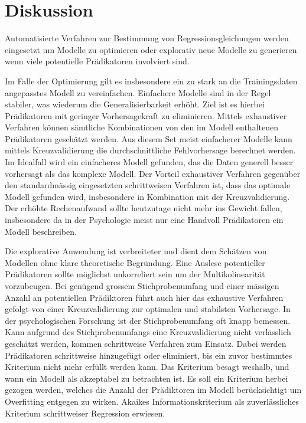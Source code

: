 \section{Diskussion}
Automatisierte Verfahren zur Bestimmung von Regressionsgleichungen werden eingesetzt um Modelle zu optimieren oder explorativ neue Modelle zu generieren wenn viele potentielle Prädikatoren involviert sind. 

Im Falle der Optimierung gilt es insbesondere ein zu stark an die Trainingsdaten angepasstes Modell zu vereinfachen. 
Einfachere Modelle sind in der Regel stabiler, was wiederum die Generalisierbarkeit erhöht.
Ziel ist es hierbei Prädikatoren mit geringer Vorhersagekraft zu eliminieren. Mittels exhaustiver Verfahren können sämtliche Kombinationen von den im Modell enthaltenen Prädikatoren geschätzt werden.
Aus diesem Set meist einfacherer Modelle kann mittels Kreuzvalidierung die durchschnittliche Fehlvorhersage berechnet werden. Im Idealfall wird ein einfacheres Modell gefunden, das die Daten generell besser vorhersagt als das komplexe Modell.
Der Vorteil exhaustiver Verfahren gegenüber den standardmässig eingesetzten schrittweisen Verfahren ist, dass das optimale Modell gefunden wird, insbesondere in Kombination mit der Kreuzvalidierung.
Der erhöhte Rechenaufwand sollte heutzutage nicht mehr ins Gewicht fallen, insbesondere da in der Psychologie meist nur eine Handvoll Prädikatoren ein Modell beschreiben.  

Die explorative Anwendung ist verbreiteter und dient dem Schätzen von Modellen ohne klare theoretische Begründung.
Eine Auslese potentieller Prädikatoren sollte möglichst unkorreliert sein um der Multikolinearität vorzubeugen. Bei genügend grossem Stichprobenumfang und einer mässigen Anzahl an potentiellen Prädiktoren führt auch hier das exhaustive Verfahren gefolgt von einer Kreuzvalidierung zur optimalen und stabilsten Vorhersage. In der psychologischen Forschung ist der Stichprobenumfang oft knapp bemessen. Kann aufgrund des Stichprobenumfangs eine Kreuzvalidierung nicht verlässlich geschätzt werden, kommen schrittweise Verfahren zum Einsatz. Dabei werden Prädikatoren schrittweise hinzugefügt oder eliminiert, bis ein zuvor bestimmtes Kriterium nicht mehr erfüllt werden kann. Das Kriterium  besagt weshalb, und wann ein Modell als akzeptabel zu betrachten ist.
Es soll ein Kriterium herbei gezogen werden, welches die Anzahl der Prädiktoren im Modell berücksichtigt um Overfitting entgegen zu wirken.
Akaikes Informationskriterium als zuverlässliches Kriterium schrittweiser Regression erwiesen.  

